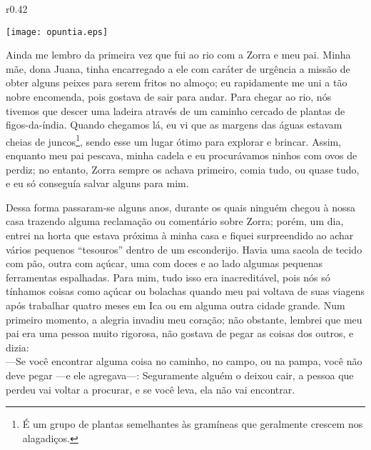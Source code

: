 \ifdefined\EnableIncludeImages
\begin{wrapfigure}{r}{0.42\textwidth}
  \begin{center}
  \vspace{-30pt}
    \texttt{[image: opuntia.eps]}
  \end{center}
  \vspace{-20pt}
\end{wrapfigure}
\fi
Ainda me lembro da primeira vez que fui ao rio com a Zorra e meu pai. 
Minha mãe, dona Juana, tinha encarregado a ele com caráter de urgência a missão de obter alguns peixes para serem fritos no almoço; eu rapidamente me uni a tão nobre encomenda, pois gostava de sair para andar. 
Para chegar ao rio, nós tivemos que descer uma ladeira através de um caminho cercado de plantas de figos-da-índia. 
Quando chegamos lá, eu vi que as margens das águas estavam cheias de juncos\footnote{É um grupo de plantas semelhantes às gramíneas que geralmente crescem nos alagadiços.}, sendo esse um lugar ótimo para explorar e brincar. 
Assim, enquanto meu pai pescava, minha cadela e eu procurávamos ninhos com ovos de perdiz; 
no entanto, Zorra sempre os achava primeiro, comia tudo, ou quase tudo, e eu só conseguía salvar alguns para mim.

Dessa forma passaram-se alguns anos, durante os quais ninguém chegou à nossa casa trazendo alguma reclamação ou comentário sobre Zorra; 
porém, um dia, entrei na horta que estava próxima à minha casa e fiquei surpreendido ao achar vários pequenos ``tesouros'' dentro de um esconderijo. 
Havia uma sacola de tecido com pão, outra com açúcar, uma com doces e ao lado algumas pequenas ferramentas espalhadas. 
Para mim, tudo isso era inacreditável, pois nós só tínhamos coisas como açúcar ou bolachas quando meu pai voltava de suas viagens após trabalhar quatro meses em Ica ou em alguma outra cidade grande.
Num primeiro momento, a alegria invadiu meu coração; não obstante, lembrei que meu pai era uma pessoa muito rigorosa, não gostava de pegar as coisas dos outros, e dizia:\\\indent
---Se você encontrar alguma coisa no caminho, no campo, ou na pampa, você não deve pegar ---e ele agregava---: 
Seguramente alguém o deixou cair, a pessoa que perdeu vai voltar a procurar, e se você leva, ela não vai encontrar.

